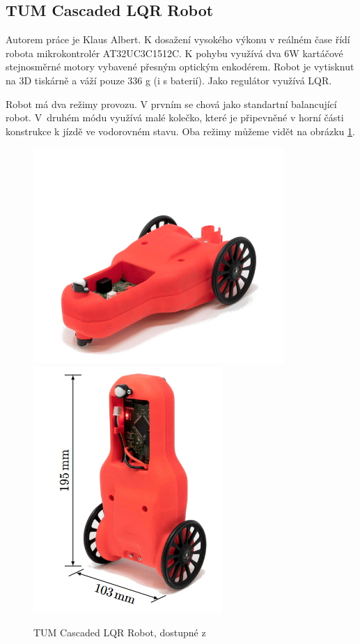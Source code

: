 \subsection*{TUM Cascaded LQR Robot}
Autorem práce je Klaus Albert. K dosažení vysokého výkonu v reálném čase řídí robota mikrokontrolér AT32UC3C1512C. K pohybu využívá dva 6W kartáčové stejnosměrné motory vybavené přesným optickým enkodérem. Robot je vytisknut na 3D tiskárně a váží pouze 336 g (i s baterií). Jako regulátor využívá LQR.

Robot má dva režimy provozu. V prvním se chová jako standartní balancující robot. V~druhém módu využívá malé kolečko, které je připevněné v horní části konstrukce k jízdě ve vodorovném stavu. Oba režimy můžeme vidět na obrázku \ref{TUM_rob}. \cite{TUM_robot}

\begin{figure}[H]
  \centering
  \includegraphics[width=0.5\linewidth]{obrazky-figures/leh_TUM.png}\hfill
  \includegraphics[width=0.5\linewidth]{obrazky-figures/stoj_TUM.png}
  \caption{TUM Cascaded LQR Robot, dostupné z \cite{TUM_robot}}
  \label{TUM_rob}
\end{figure}

